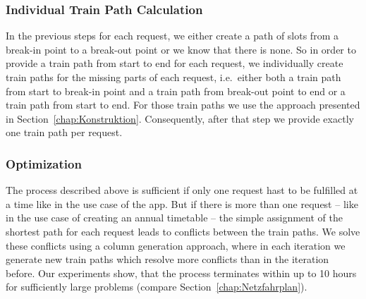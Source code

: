 \subsubsection{Individual Train Path Calculation}
In the previous steps for each request, we either create a path of slots from a break-in point to a break-out point or we know that there is none. So in order to provide a train path from start to end for each request, we individually create train paths for the missing parts of each request, i.e.\ either both a train path from start to break-in point and a train path from break-out point to end or a train path from start to end. For those train paths we use the approach presented in Section~\ref{chap:Konstruktion}. Consequently, after that step we provide exactly one train path per request.

\subsubsection{Optimization}
The process described above is sufficient if only one request hast to be fulfilled at a time like in the use case of the app. But if there is more than one request -- like in the use case of creating an annual timetable -- the simple assignment of the shortest path for each request leads to conflicts between the train paths. We solve these conflicts using a column generation approach, where in each iteration we generate new train paths which resolve more conflicts than in the iteration before. Our experiments show, that the process terminates within up to 10 hours for sufficiently large problems (compare Section~\ref{chap:Netzfahrplan}).